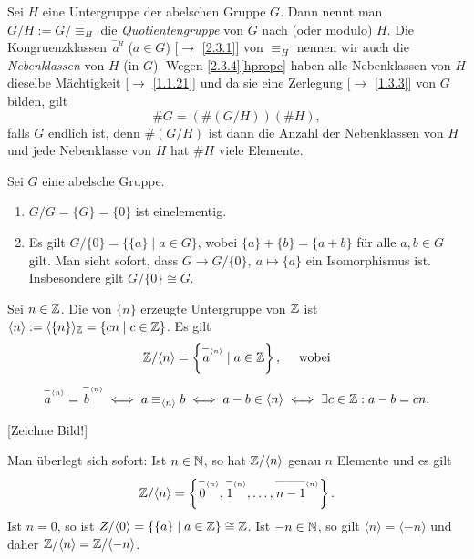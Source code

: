 \documentclass[../../main.tex]{subfiles}
\begin{document}
\begin{notsprpro}\label{2.3.7}
Sei $H$ eine Untergruppe der abelschen Gruppe $G$. Dann nennt man $G/H:=G/\mbox{$\equiv_H$}$ die \emph{Quotientengruppe} von $G$ nach (oder modulo) $H$.
Die Kongruenzklassen $\overset{-_H}{a~}$ ($a\in G$) {\rm[$\to$ \ref{2.3.1}]} von $\equiv_H$ nennen wir auch die \emph{Nebenklassen} von $H$ (in $G$).
Wegen \ref{2.3.4}\eqref{hpropc} haben alle Nebenklassen von $H$ dieselbe Mächtigkeit  {\rm[$\to$ \ref{1.1.21}]} und da sie eine Zerlegung {\rm[$\to$ \ref{1.3.3}]}
von $G$ bilden, gilt
$$\#G=(\#(G/H))(\#H),$$
falls $G$ endlich ist, denn $\#(G/H)$ ist dann die Anzahl der Nebenklassen von $H$ und jede Nebenklasse von $H$ hat $\#H$ viele Elemente.
\end{notsprpro}

\begin{bsp}\label{2.3.8}
Sei $G$ eine abelsche Gruppe.
\begin{enumerate}[\normalfont(a)]
\item $G/G=\{G\}=\{0\}$ ist einelementig.
\item Es gilt $G/\{0\}=\{\{a\}\mid a\in G\}$, wobei $\{a\}+\{b\}=\{a+b\}$ für alle $a,b\in G$ gilt. Man sieht sofort, dass $G\to G/\{0\},\ a\mapsto\{a\}$ ein Isomorphismus ist.
Insbesondere gilt $G/\{0\}\cong G$.
\end{enumerate}
\end{bsp}

\begin{bsp}\label{2.3.9}
Sei $n\in\mathbb Z$. Die von $\{n\}$ erzeugte Untergruppe von $\mathbb Z$ ist $\langle n\rangle:=\langle\{n\}\rangle_\mathbb Z=\{cn\mid c\in\mathbb Z\}$. Es gilt
$$\mathbb Z/\langle n\rangle=\left\{\overset{-_{\langle n\rangle}}{a~~~}\mid a\in\mathbb Z\right\},\quad\text{ wobei}$$
$$\overset{-_{\langle n\rangle}}{a~~~}=\overset{-_{\langle n\rangle}}{b~~~}\iff
a\equiv_{\langle n\rangle}b\iff a-b\in\langle n\rangle\iff\exists c\in\mathbb Z:a-b=cn.$$

[Zeichne Bild!]

Man überlegt sich sofort: Ist $n\in\mathbb N$, so hat $\mathbb Z/\langle n\rangle$ genau $n$ Elemente und es gilt
$$\mathbb Z/\langle n\rangle=\left\{\overset{-_{\langle n\rangle}}{0~~~},\overset{-_{\langle n\rangle}}{1~~~},\dots,\overset{\text{---------}_{\langle n\rangle}}{n-1~~~}\right\}.$$
Ist $n=0$, so ist $Z/\langle0\rangle=\{\{a\}\mid a\in\mathbb Z\}\cong\mathbb Z$. Ist $-n\in\mathbb N$, so gilt $\langle n\rangle=\langle-n\rangle$ und daher
$\mathbb Z/\langle n\rangle=\mathbb Z/\langle-n\rangle$.
\end{bsp}
\end{document}
